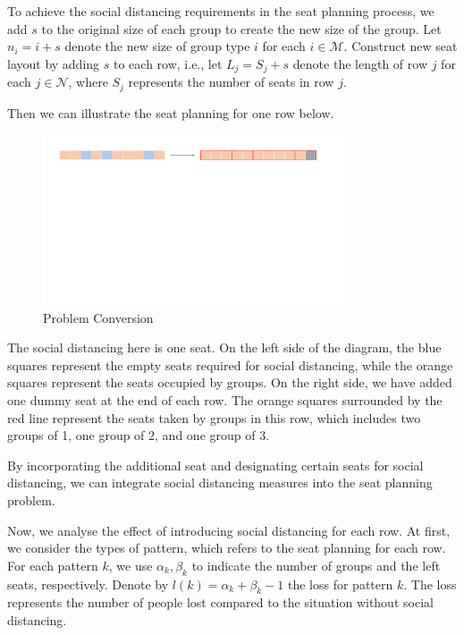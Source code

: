 To achieve the social distancing requirements in the seat planning process, we add $s$ to the original size of each group to create the new size of the group. Let $n_i = i + s$ denote the new size of group type $i$ for each $i \in \mathcal{M}$. Construct new seat layout by adding $s$ to each row, i.e., let $L_j = S_j + s$ denote the length of row $j$ for each $j \in \mathcal{N}$, where $S_j$ represents the number of seats in row $j$.


Then we can illustrate the seat planning for one row below. 

\begin{figure}[ht]
    \centering
    \includegraphics[width = 0.8\textwidth]{./Figures/dummy_seat.pdf}
    \caption{Problem Conversion}
\end{figure}

The social distancing here is one seat. On the left side of the diagram, the blue squares represent the empty seats required for social distancing, while the orange squares represent the seats occupied by groups. On the right side, we have added one dummy seat at the end of each row. The orange squares surrounded by the red line represent the seats taken by groups in this row, which includes two groups of 1, one group of 2, and one group of 3.

By incorporating the additional seat and designating certain seats for social distancing, we can integrate social distancing measures into the seat planning problem.


Now, we analyse the effect of introducing social distancing for each row. At first, we consider the types of pattern, which refers to the seat planning for each row. For each pattern $k$, we use $\alpha_k, \beta_k$ to indicate the number of groups and the left seats, respectively. Denote by $l(k) = \alpha_k + \beta_k -1$ the loss for pattern $k$. The loss represents the number of people lost compared to the situation without social distancing.

